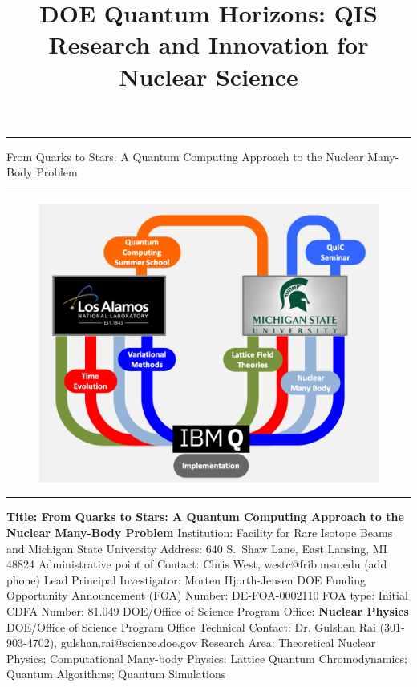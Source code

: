 \documentclass[10pt]{article}
\begin{document}
\thispagestyle{empty}

     \begin{center}
     \rule{\linewidth}{1mm}     
           \Huge From Quarks to Stars: A Quantum Computing Approach to the Nuclear Many-Body Problem
     \rule{\linewidth}{1mm}
     \end{center}
 \begin{center}
 \begin{figure}[hb]
 \includegraphics[scale=0.9]{Figures/NP_Collaboration.png}
 \end{figure}
 \end{center}
\newpage
\title{DOE Quantum Horizons: QIS Research and Innovation for Nuclear Science}
\maketitle
\rule{\linewidth}{1mm}
\begin{flushleft}
{\bf Title: From Quarks to Stars: A Quantum Computing Approach to the Nuclear Many-Body Problem}\newline
Institution: Facility for Rare Isotope Beams and Michigan State University\newline
Address: 640 S.~Shaw Lane, East Lansing, MI 48824\newline
Administrative point of Contact: Chris West, westc@frib.msu.edu (add phone) \newline
Lead Principal Investigator: Morten Hjorth-Jensen\newline
DOE Funding Opportunity Announcement (FOA) Number: DE-FOA-0002110\newline
FOA type: Initial\newline
CDFA Number: 81.049\newline
DOE/Office of Science Program Office: {\bf Nuclear Physics}\newline
DOE/Office of Science Program Office Technical Contact: Dr. Gulshan Rai (301-903-4702), gulshan.rai@science.doe.gov\newline
Research Area: Theoretical Nuclear Physics; Computational Many-body Physics; Lattice Quantum Chromodynamics; Quantum Algorithms; Quantum Simulations
\end{flushleft}
\end{document}
